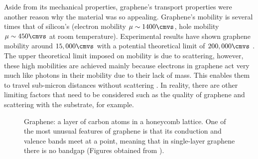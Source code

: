 \noindent Aside from its mechanical properties, graphene's transport properties were another reason why the material was so appealing. Graphene's mobility is several times that of silicon's (electron mobility $\mu\sim 1400\cmvs$, hole mobility $\mu\sim 450\cmvs$ at room temperature). Experimental results have shown graphene mobility around $15,000\cmvs$ with a potential theoretical limit of $200,000\cmvs$ \cite{Dargys_Encylco1994,Akinwande_NatureComm2014,Si_Properties}. The upper theoretical limit imposed on mobility is due to scattering, however, these high mobilities are achieved mainly because electrons in graphene act very much like photons in their mobility due to their lack of mass. This enables them to travel sub-micron distances without scattering \cite{Novoselov_NatureMat2007}. In reality, there are other limiting factors that need to be considered such as the quality of graphene and scattering with the substrate, for example. 
\begin{figure}[ht]
	\centering
	\qquad
	\caption[Lattice and band structure of graphene]{\protect{} Graphene: a layer of carbon atoms in a honeycomb lattice. \protect{} One of the most unusual features of graphene is that its conduction and valence bands meet at a point, meaning that in single-layer graphene there is no bandgap (Figures obtained from \cite{Berkley_Online2009}).}
	\label{fig:graphene_structures}
\end{figure}

